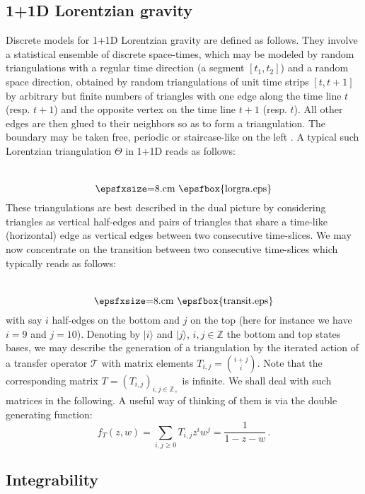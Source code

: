 \documentclass[12pt]{amsart}
\numberwithin{equation}{section}
\begin{document}
\subsection{1+1D Lorentzian gravity}
Discrete models for 1+1D Lorentzian gravity are defined as follows.  They involve
a statistical ensemble of discrete space-times, which may be modeled by random triangulations
with a regular time direction (a segment $[t_1,t_2]$) and a random space direction, obtained
by random triangulations of unit time strips $[t,t+1]$ by arbitrary but finite numbers of triangles with
one edge along the time line $t$ (resp. $t+1$) and the opposite vertex on the time line $t+1$ (resp. $t$).
All other edges are then glued to their neighbors so as to form a triangulation. The boundary may be taken
free, periodic or staircase-like on the left \cite{LORGRA}.
A typical such Lorentzian triangulation $\Theta$  in 1+1D reads as follows:
$$ \raisebox{-1.cm}{\hbox{\epsfxsize=8.cm \epsfbox{lorgra.eps}}}  $$
These triangulations are best described in the dual picture by considering triangles as vertical half-edges
and pairs of triangles that share a time-like (horizontal) edge as vertical edges between two consecutive time-slices.
We may now concentrate on the transition between two consecutive time-slices which typically reads as follows:
\begin{equation}\label{transmatbare} \raisebox{-1.cm}{\hbox{\epsfxsize=8.cm \epsfbox{transit.eps}}}  \end{equation}
with say $i$ half-edges on the bottom and $j$ on the top (here for instance we have $i=9$ and $j=10$). 
Denoting by $\vert i\rangle$ and $\vert j\rangle$, 
$i,j\in {{\mathbb Z}}$ the bottom and top states bases, we may describe the generation of a triangulation 
by the iterated action of a transfer operator ${\mathcal T}$ with matrix elements $T_{i,j}={i+j\choose i}$.
Note that the corresponding matrix $T=(T_{i,j})_{i,j\in {{\mathbb Z}}_+}$ is infinite. We shall deal with such matrices in the following.
A useful way of thinking of them is via the double generating function:
$$ f_T(z,w)=\sum_{i,j\geq 0} T_{i,j} z^i w^j =\frac{1}{1-z-w} \, .$$

\subsection{Integrability}
\end{document}
